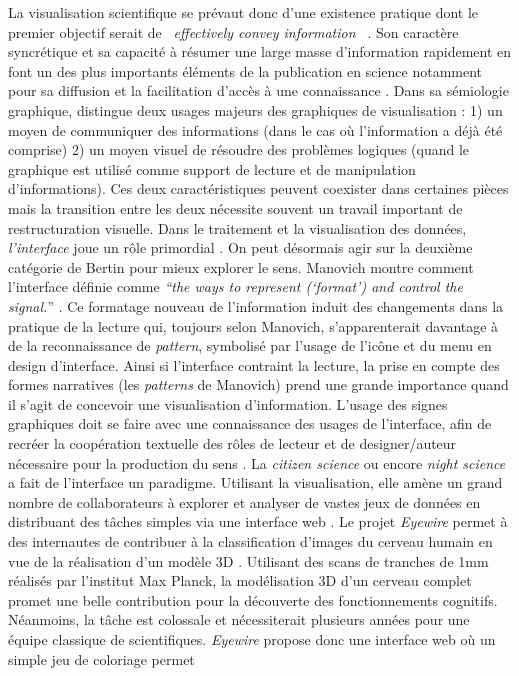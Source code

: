 La visualisation scientifique se prévaut donc d{\textquoteright}une existence pratique dont le premier objectif serait de \textit{{\guillemotleft}~effectively convey information~{\guillemotright}} \citep{Kelleher2011}. Son caractère syncrétique et sa capacité à résumer une large masse d{\textquoteright}information rapidement en font un des plus importants éléments de la publication en science notamment pour sa diffusion et la facilitation d{\textquoteright}accès à une connaissance \citep{Ware2004}. Dans sa sémiologie graphique, \cite{Bertin1977} distingue deux usages majeurs des graphiques de visualisation : 1) un moyen de communiquer des informations (dans le cas o\`u l{\textquoteright}information a déjà été comprise) 2) un moyen visuel de résoudre des problèmes logiques (quand le graphique est utilisé comme support de lecture et de manipulation d{\textquoteright}informations). Ces deux caractéristiques peuvent coexister dans certaines pièces mais la transition entre les deux nécessite souvent un travail important de restructuration visuelle. Dans le traitement et la visualisation des données, \textit{l{\textquoteright}interface} joue un r\^ole primordial \citep{Weissberg2007}. On peut désormais agir sur la deuxième catégorie de Bertin pour mieux explorer le sens. Manovich montre comment l{\textquoteright}interface définie comme \textit{{\textquotedblleft}the ways to represent ({\textquoteleft}format{\textquoteright}) and control the signal.}{\textquotedblright} \citep{Manovich2013}. Ce formatage nouveau de l{\textquoteright}information induit des changements dans la pratique de la lecture qui, toujours selon Manovich, s{\textquoteright}apparenterait davantage à de la reconnaissance de \textit{pattern}, symbolisé par l{\textquoteright}usage de l{\textquoteright}ic\^one et du menu en design d{\textquoteright}interface. Ainsi si l{\textquoteright}interface contraint la lecture, la prise en compte des formes narratives (les \textit{patterns} de Manovich) prend une grande importance quand il s{\textquoteright}agit de concevoir une visualisation d{\textquoteright}information. L{\textquoteright}usage des signes graphiques doit se faire avec une connaissance des usages de l{\textquoteright}interface, afin de recréer la coopération textuelle des r\^oles de lecteur et de designer/auteur nécessaire pour la production du sens \citep{Eco1985}. La \textit{citizen science} ou encore \textit{night science} a fait de l{\textquoteright}interface un paradigme. Utilisant la visualisation, elle amène un grand nombre de collaborateurs à explorer et analyser de vastes jeux de données en distribuant des t\^aches simples via une interface web \citep{Silvertown2009}. Le projet \textit{Eyewire} permet à des internautes de contribuer à la classification d{\textquoteright}images du cerveau humain en vue de la réalisation d{\textquoteright}un modèle 3D \citep{Seung2012}. Utilisant des scans de tranches de 1mm réalisés par l{\textquoteright}institut Max Planck, la modélisation 3D d{\textquoteright}un cerveau complet promet une belle contribution pour la découverte des fonctionnements cognitifs. Néanmoins, la t\^ache est colossale et nécessiterait plusieurs années pour une équipe classique de scientifiques. \textit{Eyewire} propose donc une interface web o\`u un simple jeu de coloriage permet 